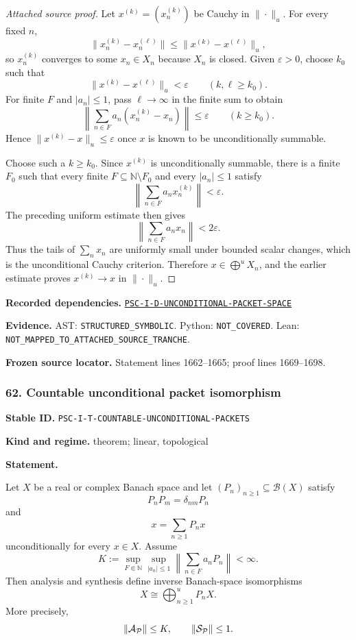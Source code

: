 \documentclass[a4paper,11pt]{article}
\newcommand{\field}[2]{\noindent\textbf{#1.} #2\par}
\begin{document}
\begin{proof}[Attached source proof]
Let $x^{(k)}=(x_n^{(k)})$ be Cauchy in $\|\cdot\|_u$.  For every fixed $n$,
\[
\|x_n^{(k)}-x_n^{(\ell)}\|
\leq
\|x^{(k)}-x^{(\ell)}\|_u,
\]
so $x_n^{(k)}$ converges to some $x_n\in X_n$ because $X_n$ is closed.  Given $\varepsilon>0$, choose $k_0$ such that
\[
\|x^{(k)}-x^{(\ell)}\|_u<\varepsilon
\qquad(k,\ell\geq k_0).
\]
For finite $F$ and $|a_n|\leq1$, pass $\ell\to\infty$ in the finite sum to obtain
\[
\left\|\sum_{n\in F}a_n(x_n^{(k)}-x_n)\right\|
\leq\varepsilon
\qquad(k\geq k_0).
\]
Hence $\|x^{(k)}-x\|_u\leq\varepsilon$ once $x$ is known to be unconditionally summable.

Choose such a $k\geq k_0$.  Since $x^{(k)}$ is unconditionally summable, there is a finite $F_0$ such that every finite $F\subseteq\mathbb N\setminus F_0$ and every $|a_n|\leq1$ satisfy
\[
\left\|\sum_{n\in F}a_nx_n^{(k)}\right\|<\varepsilon.
\]
The preceding uniform estimate then gives
\[
\left\|\sum_{n\in F}a_nx_n\right\|<2\varepsilon.
\]
Thus the tails of $\sum_nx_n$ are uniformly small under bounded scalar changes, which is the unconditional Cauchy criterion.  Therefore $x\in\bigoplus^uX_n$, and the earlier estimate proves $x^{(k)}\to x$ in $\|\cdot\|_u$.
\end{proof}
\field{Recorded dependencies}{\hyperref[rec:PSC-I-D-UNCONDITIONAL-PACKET-SPACE]{\nolinkurl{PSC-I-D-UNCONDITIONAL-PACKET-SPACE}}}
\field{Evidence}{AST: \nolinkurl{STRUCTURED_SYMBOLIC}. Python: \nolinkurl{NOT_COVERED}. Lean: \nolinkurl{NOT_MAPPED_TO_ATTACHED_SOURCE_TRANCHE}.}
\field{Frozen source locator}{Statement lines 1662--1665; proof lines 1669--1698.}
\subsubsection*{62. Countable unconditional packet isomorphism}
\label{rec:PSC-I-T-COUNTABLE-UNCONDITIONAL-PACKETS}
\field{Stable ID}{\nolinkurl{PSC-I-T-COUNTABLE-UNCONDITIONAL-PACKETS}}
\field{Kind and regime}{theorem; linear, topological}
\textbf{Statement.}\par
Let $X$ be a real or complex Banach space and let $(P_n)_{n\geq1}\subseteq\mathcal B(X)$ satisfy
\[
P_nP_m=\delta_{nm}P_n
\]
and
\[
x=\sum_{n\geq1}P_nx
\]
unconditionally for every $x\in X$.  Assume
\[
K:=
\sup_{F\Subset\mathbb N}
\sup_{|a_n|\leq1}
\left\|\sum_{n\in F}a_nP_n\right\|<\infty.
\]
Then analysis and synthesis define inverse Banach-space isomorphisms
\[
\boxed{
X\cong\bigoplus_{n\geq1}^{u}P_nX.
}
\]
More precisely,
\[
\|\mathcal A_{\mathcal P}\|\leq K,
\qquad
\|\mathcal S_{\mathcal P}\|\leq1.
\]
\end{document}
